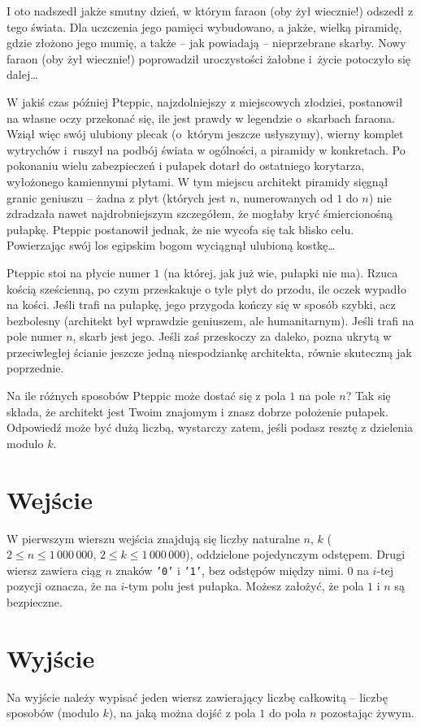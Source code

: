 \documentclass{spiral-kurs}
\begin{document}
\makeheader
%

I oto nadszedł jakże smutny dzień, w którym faraon (oby żył wiecznie!) odszedł z tego świata. Dla uczczenia jego pamięci wybudowano, a jakże, wielką piramidę, gdzie złożono jego mumię, a także -- jak powiadają -- nieprzebrane skarby.
Nowy faraon (oby żył wiecznie!) poprowadził uroczystości żałobne i~życie potoczyło się dalej\ldots

W jakiś czas później Pteppic, najzdolniejszy z miejscowych złodziei, postanowił na własne oczy przekonać się, ile jest prawdy w legendzie o~skarbach faraona. Wziął więc swój ulubiony plecak (o~którym jeszcze usłyszymy), wierny komplet wytrychów i~ruszył na podbój świata w ogólności, a piramidy w konkretach. Po pokonaniu wielu zabezpieczeń i pułapek dotarł do ostatniego korytarza, wyłożonego kamiennymi płytami. W tym miejscu architekt piramidy sięgnął granic geniuszu -- żadna z płyt (których jest $n$, numerowanych od $1$ do $n$) nie zdradzała nawet najdrobniejszym szczegółem, że mogłaby kryć śmiercionośną pułapkę. Pteppic postanowił jednak, że nie wycofa się tak blisko celu.
Powierzając swój los egipskim bogom wyciągnął ulubioną kostkę\ldots

Pteppic stoi na płycie numer $1$ (na której, jak już wie, pułapki nie ma). Rzuca kością sześcienną, po czym przeskakuje o tyle płyt do przodu, ile oczek wypadło na kości. Jeśli trafi na pułapkę, jego przygoda kończy się w sposób szybki, acz bezbolesny (architekt był wprawdzie geniuszem, ale humanitarnym). Jeśli trafi na pole numer $n$, skarb jest jego. Jeśli zaś przeskoczy za daleko, pozna ukrytą w przeciwległej ścianie jeszcze jedną niespodziankę architekta, równie skuteczną jak poprzednie.

Na ile różnych sposobów Pteppic może dostać się z pola $1$ na pole $n$? Tak się składa, że architekt jest Twoim znajomym i znasz dobrze położenie pułapek. Odpowiedź może być dużą liczbą, wystarczy zatem, jeśli podasz resztę z dzielenia modulo $k$.

    \section{Wejście}

W pierwszym wierszu wejścia znajdują się liczby naturalne $n$, $k$
($2 \leq n \leq 1\,000\,000$, $2 \leq k \leq 1\,000\,000$), oddzielone pojedynczym
odstępem.
Drugi wiersz zawiera ciąg $n$ znaków \texttt{'0'} i \texttt{'1'}, bez odstępów między nimi.
$0$ na $i$-tej pozycji oznacza, że na $i$-tym polu jest pułapka.
Możesz założyć, że pola $1$ i $n$ są bezpieczne.


    \section{Wyjście}

Na wyjście należy wypisać jeden wiersz zawierający liczbę całkowitą -- liczbę
sposobów (modulo $k$), na jaką można dojść z pola $1$ do pola $n$ pozostając żywym.


  
\end{document}
